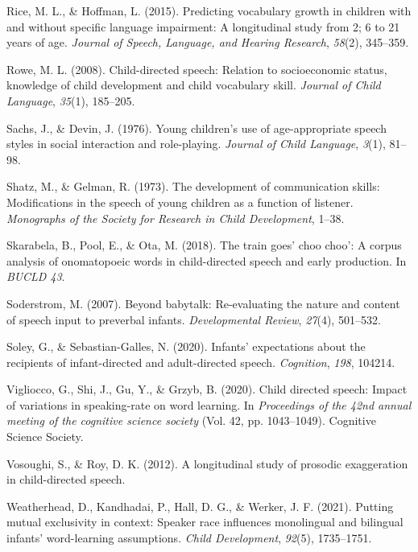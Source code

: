 \documentclass[10pt, letterpaper]{article}
\newenvironment{CSLReferences}%
  {}%
  {\par}
\begin{document}
\begin{CSLReferences}{1}{0}
\leavevmode\hypertarget{ref-rice2015predicting}{}%
Rice, M. L., \& Hoffman, L. (2015). Predicting vocabulary growth in
children with and without specific language impairment: A longitudinal
study from 2; 6 to 21 years of age. \emph{Journal of Speech, Language,
and Hearing Research}, \emph{58}(2), 345--359.

\leavevmode\hypertarget{ref-rowe2008child}{}%
Rowe, M. L. (2008). Child-directed speech: Relation to socioeconomic
status, knowledge of child development and child vocabulary skill.
\emph{Journal of Child Language}, \emph{35}(1), 185--205.

\leavevmode\hypertarget{ref-sachs1976young}{}%
Sachs, J., \& Devin, J. (1976). Young children's use of age-appropriate
speech styles in social interaction and role-playing. \emph{Journal of
Child Language}, \emph{3}(1), 81--98.

\leavevmode\hypertarget{ref-shatz1973development}{}%
Shatz, M., \& Gelman, R. (1973). The development of communication
skills: Modifications in the speech of young children as a function of
listener. \emph{Monographs of the Society for Research in Child
Development}, 1--38.

\leavevmode\hypertarget{ref-skarabela2018train}{}%
Skarabela, B., Pool, E., \& Ota, M. (2018). The train goes' choo choo':
A corpus analysis of onomatopoeic words in child-directed speech and
early production. In \emph{BUCLD 43}.

\leavevmode\hypertarget{ref-soderstrom2007beyond}{}%
Soderstrom, M. (2007). Beyond babytalk: Re-evaluating the nature and
content of speech input to preverbal infants. \emph{Developmental
Review}, \emph{27}(4), 501--532.

\leavevmode\hypertarget{ref-soley2020infants}{}%
Soley, G., \& Sebastian-Galles, N. (2020). Infants' expectations about
the recipients of infant-directed and adult-directed speech.
\emph{Cognition}, \emph{198}, 104214.

\leavevmode\hypertarget{ref-vigliocco2020child}{}%
Vigliocco, G., Shi, J., Gu, Y., \& Grzyb, B. (2020). Child directed
speech: Impact of variations in speaking-rate on word learning. In
\emph{Proceedings of the 42nd annual meeting of the cognitive science
society} (Vol. 42, pp. 1043--1049). Cognitive Science Society.

\leavevmode\hypertarget{ref-vosoughi2012longitudinal}{}%
Vosoughi, S., \& Roy, D. K. (2012). A longitudinal study of prosodic
exaggeration in child-directed speech.

\leavevmode\hypertarget{ref-weatherhead2021putting}{}%
Weatherhead, D., Kandhadai, P., Hall, D. G., \& Werker, J. F. (2021).
Putting mutual exclusivity in context: Speaker race influences
monolingual and bilingual infants' word-learning assumptions.
\emph{Child Development}, \emph{92}(5), 1735--1751.

\end{CSLReferences}


\end{document}
